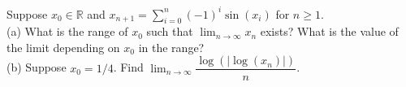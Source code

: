\begin{problem}
    Suppose \( x_0 \in \mathbb{R} \) and \( x_{n+1} = \sum_{i=0}^{n} \left(-1\right)^i \sin\left(x_i\right) \) for \( n \geq 1 \).\\
    (a) What is the range of \( x_0 \) such that \( \lim_{n \to \infty} x_n \) exists? What is the value of the limit depending on \( x_0 \) in the range?\\
    (b) Suppose \( x_0 = 1/4 \). Find \( \lim_{n \to \infty} \dfrac{\log\left(\left| \log\left(x_n\right) \right|\right)}{n} \).
\end{problem}
